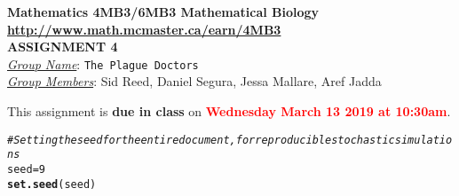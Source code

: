 \documentclass[12pt]{article}\usepackage[]{graphicx}\usepackage[]{color}
\makeatletter
\newcommand{\hlnum}[1]{\textcolor[rgb]{0.686,0.059,0.569}{#1}}%
\newcommand{\hlcom}[1]{\textcolor[rgb]{0.678,0.584,0.686}{\textit{#1}}}%
\newcommand{\hlstd}[1]{\textcolor[rgb]{0.345,0.345,0.345}{#1}}%
\newcommand{\hlkwb}[1]{\textcolor[rgb]{0.69,0.353,0.396}{#1}}%
\newcommand{\hlkwd}[1]{\textcolor[rgb]{0.737,0.353,0.396}{\textbf{#1}}}%
\newenvironment{kframe}{%
 \def\at@end@of@kframe{}%
 \ifinner\ifhmode%
  \def\at@end@of@kframe{\end{minipage}}%
  \begin{minipage}{\columnwidth}%
 \fi\fi%
 \def\FrameCommand##1{\hskip\@totalleftmargin \hskip-\fboxsep
 \colorbox{shadecolor}{##1}\hskip-\fboxsep
     \hskip-\linewidth \hskip-\@totalleftmargin \hskip\columnwidth}%
 \MakeFramed {\advance\hsize-\width
   \@totalleftmargin\z@ \linewidth\hsize
   \@setminipage}}%
 {\par\unskip\endMakeFramed%
 \at@end@of@kframe}
\newenvironment{knitrout}{}{} %
\makeatother
\begin{document}
\begin{center}
{\bf Mathematics 4MB3/6MB3 Mathematical Biology\\
\smallskip
\url{http://www.math.mcmaster.ca/earn/4MB3}\\
 ASSIGNMENT 4}\\
\medskip
\underline{\emph{Group Name}}: \texttt{{\color{blue}The Plague Doctors}}\\
\medskip
\underline{\emph{Group Members}}: {\color{blue}Sid Reed, Daniel Segura, Jessa Mallare, Aref Jadda}
\end{center}

\bigskip
\noindent
This assignment is {\bfseries\color{red} due in class} on \textcolor{red}{\bf Wednesday March 13 2019 at 10:30am}.
\bigskip

\begin{knitrout}
\color{fgcolor}\begin{kframe}
\begin{alltt}
\hlcom{#Setting the seed for the entire document, for reproducible stochastic simulations}
\hlstd{seed} \hlkwb{=} \hlnum{9}
\hlkwd{set.seed}\hlstd{(seed)}
\end{alltt}
\end{kframe}
\end{knitrout}
\end{document}
